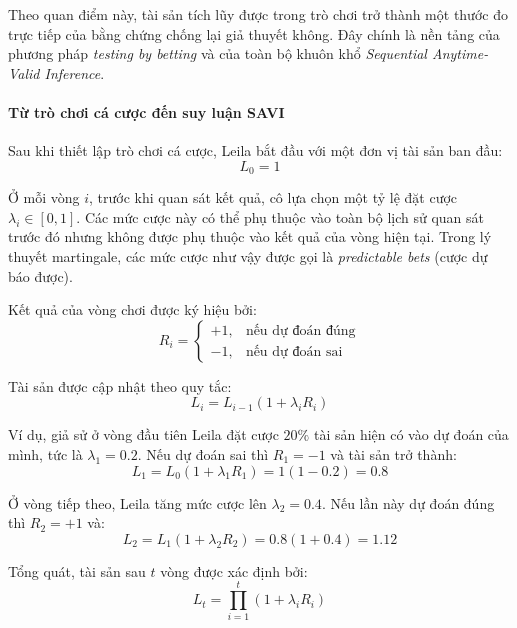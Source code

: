 Theo quan điểm này, tài sản tích lũy được trong trò chơi trở thành một thước đo trực tiếp của bằng chứng chống lại giả thuyết không. Đây chính là nền tảng của phương pháp \textit{testing by betting} và của toàn bộ khuôn khổ \textit{Sequential Anytime-Valid Inference}.

\paragraph{Từ trò chơi cá cược đến suy luận SAVI}

Sau khi thiết lập trò chơi cá cược, Leila bắt đầu với một đơn vị tài sản ban đầu:
\begin{equation}
    L_0 = 1
\end{equation}

Ở mỗi vòng $i$, trước khi quan sát kết quả, cô lựa chọn một tỷ lệ đặt cược $\lambda_i \in [0,1]$. Các mức cược này có thể phụ thuộc vào toàn bộ lịch sử quan sát trước đó nhưng không được phụ thuộc vào kết quả của vòng hiện tại. Trong lý thuyết martingale, các mức cược như vậy được gọi là \textit{predictable bets} (cược dự báo được).

Kết quả của vòng chơi được ký hiệu bởi:
\begin{equation}
    R_i =
    \begin{cases}
        +1, & \text{nếu dự đoán đúng} \\
        -1, & \text{nếu dự đoán sai}
    \end{cases}
\end{equation}

Tài sản được cập nhật theo quy tắc:
\begin{equation}
    L_i = L_{i-1}(1+\lambda_i R_i)
\end{equation}

Ví dụ, giả sử ở vòng đầu tiên Leila đặt cược $20\%$ tài sản hiện có vào dự đoán của mình, tức là $\lambda_1=0.2$. Nếu dự đoán sai thì $R_1=-1$ và tài sản trở thành:
\begin{equation}
    L_1 = L_0(1+\lambda_1 R_1) = 1(1-0.2) = 0.8
\end{equation}

Ở vòng tiếp theo, Leila tăng mức cược lên $\lambda_2=0.4$. Nếu lần này dự đoán đúng thì $R_2=+1$ và:
\begin{equation}
    L_2 = L_1(1+\lambda_2 R_2) = 0.8(1+0.4) = 1.12
\end{equation}

Tổng quát, tài sản sau $t$ vòng được xác định bởi:
\begin{equation}
    L_t = \prod_{i=1}^{t} (1+\lambda_i R_i)
\end{equation}

